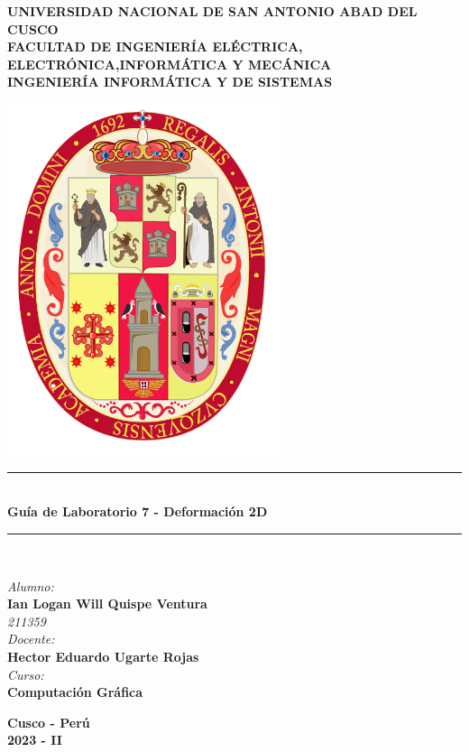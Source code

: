 \documentclass[a4paper]{article}
\begin{document}
\begin{titlepage}

\newcommand{\linea}{\rule{\linewidth}{0.7mm}} 
\center
\textbf{\Large UNIVERSIDAD NACIONAL DE SAN ANTONIO ABAD DEL CUSCO}\\[0.2cm]
\textbf{\Large FACULTAD DE INGENIERÍA ELÉCTRICA, ELECTRÓNICA,INFORMÁTICA Y MECÁNICA}\\[0.2cm]
\textbf{\Large INGENIERÍA INFORMÁTICA Y DE SISTEMAS\\[0.6cm]}

\includegraphics[width=8cm]{src/escudo-unsaac.png}
\vfill

\linea
\\[0.3cm]
\textbf{\LARGE Guía de Laboratorio 7 - Deformación 2D}\\[0.2cm]
\linea \\
\vfill

\textit{\Large Alumno:}\\
    \textbf{\large Ian Logan Will Quispe Ventura}\\
    \textit{211359}\\

\vspace{0.3cm}
    \textit{\Large Docente:}\\
    \textbf{\large Hector Eduardo Ugarte Rojas}\\
\vspace{0.5cm}
    \textit{\Large Curso:}\\
    \textbf{\large Computación Gráfica}\\
    \vfill

\vspace{0.4cm}
    \textbf{\Large Cusco - Perú }\\
    \textbf{\large 2023 - II }\\
    \newpage
    \end{titlepage}
\end{document}
